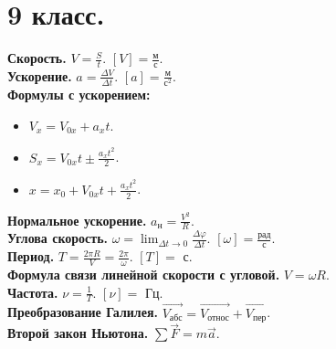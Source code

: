 \documentclass[12pt]{article}
\begin{document}
	
	
	
	
	\section{9 класс.}
	\textbf{Скорость.} $V = \frac{S}{t}$. $[V] = \frac{\text{м}}{\text{с}}$. \\
	\textbf{Ускорение.} $a = \frac{\varDelta V}{\varDelta t}$. $[a] = \frac{\text{м}}{\text{с}^2}$. \\
	\textbf{Формулы с ускорением:}
	\begin{itemize}
		\item $V_x = V_{0x} + a_xt$.
		\item $S_x = V_{0x}t \pm \frac{a_xt^2}{2}$.
		\item $x = x_0 + V_{0x}t + \frac{a_xt^2}{2}$.
	\end{itemize}
	\textbf{Нормальное ускорение.} $a_{\text{н}} = \frac{V^2}{R}$. \\
	\textbf{Углова скорость.} $\omega = \lim_{\varDelta t \rightarrow 0} \frac{\varDelta \varphi}{\varDelta t}$. $[\omega] = \frac{\text{рад}}{\text{с}}$. \\
	\textbf{Период.} $T = \frac{2 \pi R}{V} = \frac{2 \pi}{\omega}$. $[T] =$ с. \\
	\textbf{Формула связи линейной скорости с угловой.} $V = \omega R$. \\
	\textbf{Частота.} $\nu = \frac{1}{T}$. $[\nu] =$ Гц. \\
	\textbf{Преобразование Галилея.} $\vec{V_{\text{абс}}} = \vec{V_{\text{относ}}} + \vec{V_{\text{пер}}}$. \\
	\textbf{Второй закон Ньютона.} $\sum\vec{F} = m\vec{a}$. \\
\end{document}
